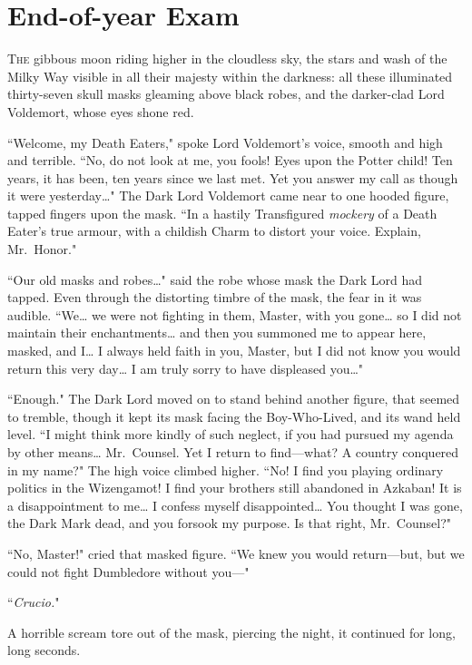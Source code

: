 \chapter{End-of-year Exam}

\lettrine{T}{he} gibbous moon riding higher in the cloudless sky, the stars and wash of the Milky Way visible in all their majesty within the darkness: all these illuminated thirty-seven skull masks gleaming above black robes, and the darker-clad Lord Voldemort, whose eyes shone red.

``Welcome, my Death Eaters," spoke Lord Voldemort's voice, smooth and high and terrible. ``No, do not look at me, you fools! Eyes upon the Potter child! Ten years, it has been, ten years since we last met. Yet you answer my call as though it were yesterday{\ldots}" The Dark Lord Voldemort came near to one hooded figure, tapped fingers upon the mask. ``In a hastily Transfigured \emph{mockery} of a Death Eater's true armour, with a childish Charm to distort your voice. Explain, Mr.~Honor."

``Our old masks and robes{\ldots}" said the robe whose mask the Dark Lord had tapped. Even through the distorting timbre of the mask, the fear in it was audible. ``We{\ldots} we were not fighting in them, Master, with you gone{\ldots} so I did not maintain their enchantments{\ldots} and then you summoned me to appear here, masked, and I{\ldots} I always held faith in you, Master, but I did not know you would return this very day{\ldots} I am truly sorry to have displeased you{\ldots}"

``Enough." The Dark Lord moved on to stand behind another figure, that seemed to tremble, though it kept its mask facing the Boy-Who-Lived, and its wand held level. ``I might think more kindly of such neglect, if you had pursued my agenda by other means{\ldots} Mr.~Counsel. Yet I return to find—what? A country conquered in my name?" The high voice climbed higher. ``No! I find you playing ordinary politics in the Wizengamot! I find your brothers still abandoned in Azkaban! It is a disappointment to me{\ldots} I confess myself disappointed{\ldots} You thought I was gone, the Dark Mark dead, and you forsook my purpose. Is that right, Mr.~Counsel?"

``No, Master!" cried that masked figure. ``We knew you would return—but, but we could not fight Dumbledore without you—"

``\emph{Crucio.}"

A horrible scream tore out of the mask, piercing the night, it continued for long, long seconds.

